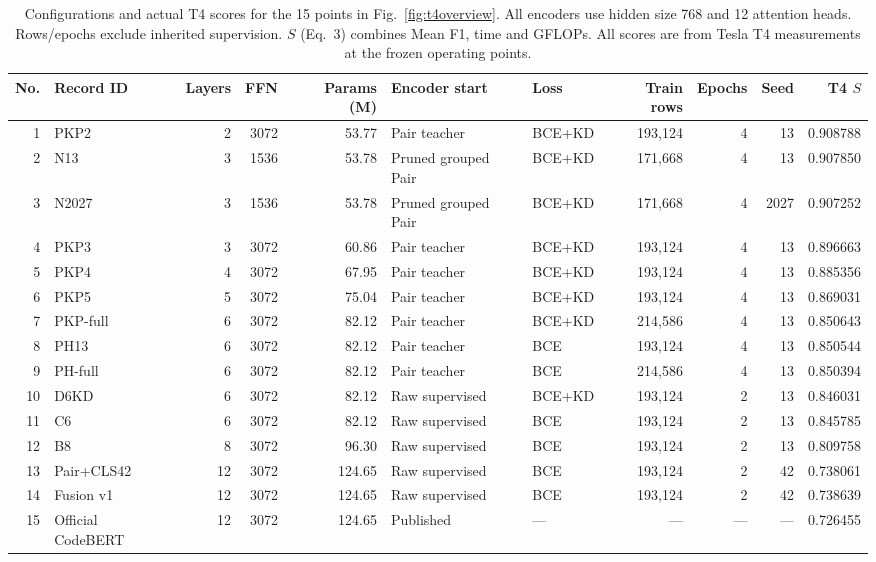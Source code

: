 \documentclass[10pt,conference]{IEEEtran}
\begin{document}
\begin{table}[t]
\centering
\caption{Configurations and actual T4 scores for the 15 points in Fig.~\ref{fig:t4overview}. All encoders use hidden size 768 and 12 attention heads. Rows/epochs exclude inherited supervision. $S$ (Eq.~3) combines Mean F1, time and GFLOPs. All scores are from Tesla T4 measurements at the frozen operating points.}
\label{tab:configurations}
\small
\setlength{\tabcolsep}{4pt}
\begin{tabular}{@{}rlrrrllrrrr@{}}
\toprule
No. & Record ID & Layers & FFN & Params (M) & Encoder start & Loss & Train rows & Epochs & Seed & T4 $S$\\
\midrule
1 & PKP2 & 2 & 3072 & 53.77 & Pair teacher & BCE+KD & 193,124 & 4 & 13 & 0.908788\\
2 & N13 & 3 & 1536 & 53.78 & Pruned grouped Pair & BCE+KD & 171,668 & 4 & 13 & 0.907850\\
3 & N2027 & 3 & 1536 & 53.78 & Pruned grouped Pair & BCE+KD & 171,668 & 4 & 2027 & 0.907252\\
4 & PKP3 & 3 & 3072 & 60.86 & Pair teacher & BCE+KD & 193,124 & 4 & 13 & 0.896663\\
5 & PKP4 & 4 & 3072 & 67.95 & Pair teacher & BCE+KD & 193,124 & 4 & 13 & 0.885356\\
6 & PKP5 & 5 & 3072 & 75.04 & Pair teacher & BCE+KD & 193,124 & 4 & 13 & 0.869031\\
7 & PKP-full & 6 & 3072 & 82.12 & Pair teacher & BCE+KD & 214,586 & 4 & 13 & 0.850643\\
8 & PH13 & 6 & 3072 & 82.12 & Pair teacher & BCE & 193,124 & 4 & 13 & 0.850544\\
9 & PH-full & 6 & 3072 & 82.12 & Pair teacher & BCE & 214,586 & 4 & 13 & 0.850394\\
10 & D6KD & 6 & 3072 & 82.12 & Raw supervised & BCE+KD & 193,124 & 2 & 13 & 0.846031\\
11 & C6 & 6 & 3072 & 82.12 & Raw supervised & BCE & 193,124 & 2 & 13 & 0.845785\\
12 & B8 & 8 & 3072 & 96.30 & Raw supervised & BCE & 193,124 & 2 & 13 & 0.809758\\
13 & Pair+CLS42 & 12 & 3072 & 124.65 & Raw supervised & BCE & 193,124 & 2 & 42 & 0.738061\\
14 & Fusion v1 & 12 & 3072 & 124.65 & Raw supervised & BCE & 193,124 & 2 & 42 & 0.738639\\
15 & Official CodeBERT & 12 & 3072 & 124.65 & Published & --- & --- & --- & --- & 0.726455\\
\bottomrule
\end{tabular}


\end{table}
\end{document}
